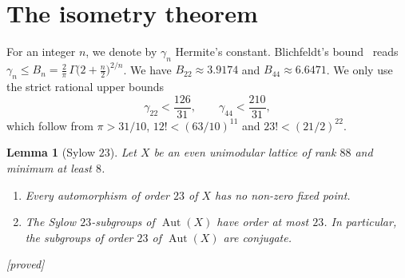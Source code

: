 \documentclass[11pt,a4paper]{amsart}
\theoremstyle{plain}
\newtheorem{lemma}[theorem]{Lemma}
\theoremstyle{definition}
\numberwithin{equation}{section}
\DeclareMathOperator{\Aut}{Aut}
\newcommand{\st}[1]{\textup{\textsf{\small[#1]}}}
\newcommand{\DEM}{\st{proved}}
\begin{document}
\section{The isometry theorem}\label{sec:isometrie}

For an integer $n$, we denote by $\gamma_n$ Hermite's constant. Blichfeldt's bound~\cite{Bli29} reads $\gamma_n\le B_n=\frac2\pi\,\Gamma\bigl(2+\frac n2\bigr)^{2/n}$. We have $B_{22}\approx3.9174$ and $B_{44}\approx6.6471$. We only use the strict rational upper bounds
\begin{equation}\label{eq:blichfeldt}
\gamma_{22}<\frac{126}{31},\qquad \gamma_{44}<\frac{210}{31},
\end{equation}
which follow from $\pi>31/10$, $12!<(63/10)^{11}$ and $23!<(21/2)^{22}$.

\begin{lemma}[Sylow $23$]\label{lem:syl23}
Let $X$ be an even unimodular lattice of rank $88$ and minimum at least $8$.
\begin{enumerate}[label=\textup{(\alph*)}]
\item Every automorphism of order $23$ of $X$ has no non-zero fixed point.
\item The Sylow $23$-subgroups of $\Aut(X)$ have order at most $23$. In particular, the subgroups of order $23$ of $\Aut(X)$ are conjugate.
\end{enumerate}
\DEM
\end{lemma}
\end{document}
